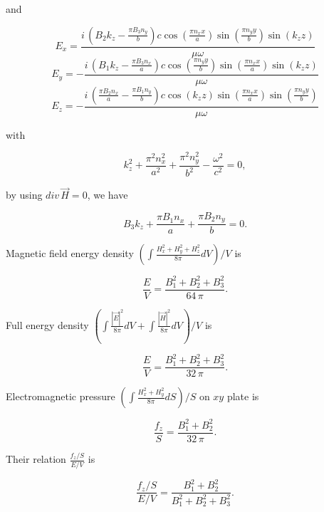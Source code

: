 \documentclass[twoside, 10pt, ptm]{article}
\begin{document}
\begin{multicols}{2}
    and

\[E_{x} = \frac{i \, {\left(B_{2} k_{z} - \frac{\pi B_{3} n_{y}}{b}\right)} c \cos\left(\frac{\pi n_{x} x}{a}\right) \sin\left(\frac{\pi n_{y} y}{b}\right) \sin\left(k_{z} z\right)}{\mu \omega}\]
\[E_{y} = -\frac{i \, {\left(B_{1} k_{z} - \frac{\pi B_{3} n_{x}}{a}\right)} c \cos\left(\frac{\pi n_{y} y}{b}\right) \sin\left(\frac{\pi n_{x} x}{a}\right) \sin\left(k_{z} z\right)}{\mu \omega}\]
\[E_{z} = -\frac{i \, {\left(\frac{\pi B_{2} n_{x}}{a} - \frac{\pi B_{1} n_{y}}{b}\right)} c \cos\left(k_{z} z\right) \sin\left(\frac{\pi n_{x} x}{a}\right) \sin\left(\frac{\pi n_{y} y}{b}\right)}{\mu \omega}\]

    with

\begin{equation}k_{z}^{2} + \frac{\pi^{2} n_{x}^{2}}{a^{2}} + \frac{\pi^{2} n_{y}^{2}}{b^{2}} - \frac{\omega^{2}}{c^{2}} = 0,\end{equation}

    by using \(div\,\vec{H} = 0\), we have

\begin{equation}B_{3} k_{z} + \frac{\pi B_{1} n_{x}}{a} + \frac{\pi B_{2} n_{y}}{b} = 0.\end{equation}

    Magnetic field energy density
\(\left(\int \frac{H_x^2+H_y^2+H_z^2}{8 \pi}dV\right)\big/{V}\) is

\begin{equation}\frac{E}{V} = \frac{{B_{1}^{2} + B_{2}^{2} + B_{3}^{2}}}{64 \, \pi}.\end{equation}

    Full energy density
\(\left(\int \frac{|\vec{E}|^2}{8 \pi}dV + \int \frac{|\vec{H}|^2}{8 \pi}dV\right)\big/{V}\)
is

\begin{equation}\frac{E}{V} = \frac{{B_{1}^{2} + B_{2}^{2} + B_{3}^{2}}}{32 \, \pi}.\end{equation}

    Electromagnetic pressure
\(\left({\int \frac {H_x^2+H_y^2}{8 \pi} dS}\right)\big/{S}\) on \(xy\)
plate is

\begin{equation}\frac{f_z}{S}=\frac{{B_{1}^{2} + B_{2}^{2}}}{32 \, \pi}.\end{equation}

Their relation \(\frac{f_z/S}{E/V}\) is

\begin{equation}\frac{f_z/S}{E/V} = \frac{{B_{1}^{2} + B_{2}^{2}}}{B_{1}^{2} + B_{2}^{2} + B_{3}^{2}}.\end{equation}


\end{multicols}
\end{document}

